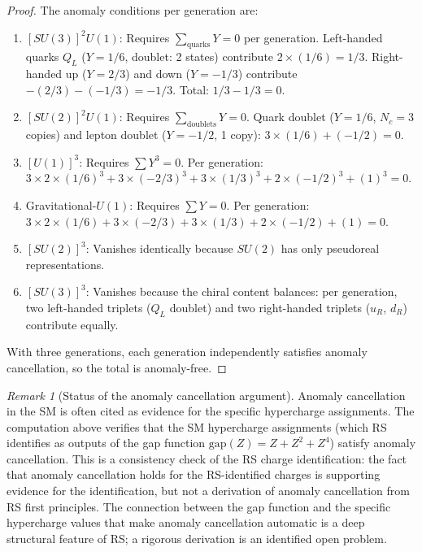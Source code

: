 \documentclass[12pt,a4paper]{article}
\theoremstyle{definition}
\theoremstyle{remark}
\newtheorem{remark}[theorem]{Remark}
\begin{document}
\begin{proof}
The anomaly conditions per generation are:
\begin{enumerate}[label=(\roman*)]
  \item $[SU(3)]^2 U(1)$: Requires
  $\sum_{\mathrm{quarks}} Y = 0$ per generation.
  Left-handed quarks $Q_L$ ($Y = 1/6$, doublet: 2 states)
  contribute $2 \times (1/6) = 1/3$.  Right-handed up
  ($Y = 2/3$) and down ($Y = -1/3$) contribute
  $-(2/3) - (-1/3) = -1/3$.  Total: $1/3 - 1/3 = 0$.

  \item $[SU(2)]^2 U(1)$: Requires $\sum_{\mathrm{doublets}} Y = 0$.
  Quark doublet ($Y = 1/6$, $N_c = 3$ copies) and lepton
  doublet ($Y = -1/2$, 1 copy): $3 \times (1/6) + (-1/2) = 0$.

  \item $[U(1)]^3$: Requires $\sum Y^3 = 0$.  Per generation:
  $3 \times 2 \times (1/6)^3 + 3 \times (-2/3)^3 +
  3 \times (1/3)^3 + 2 \times (-1/2)^3 + (1)^3 = 0$.

  \item Gravitational-$U(1)$: Requires $\sum Y = 0$.
  Per generation: $3 \times 2 \times (1/6) + 3 \times (-2/3) +
  3 \times (1/3) + 2 \times (-1/2) + (1) = 0$.

  \item $[SU(2)]^3$: Vanishes identically because $SU(2)$
  has only pseudoreal representations.

  \item $[SU(3)]^3$: Vanishes because the chiral content
  balances: per generation, two left-handed triplets ($Q_L$
  doublet) and two right-handed triplets ($u_R$, $d_R$)
  contribute equally.
\end{enumerate}
With three generations, each generation independently satisfies
anomaly cancellation, so the total is anomaly-free.
\end{proof}

\begin{remark}[Status of the anomaly cancellation argument]
Anomaly cancellation in the SM is often cited as evidence for
the specific hypercharge assignments.  The computation above verifies
that the SM hypercharge assignments (which RS identifies as outputs of the gap
function $\mathrm{gap}(Z) = Z + Z^2 + Z^4$) satisfy anomaly cancellation.
This is a consistency check of the RS charge identification: the fact that
anomaly cancellation holds for the RS-identified charges is supporting
evidence for the identification, but not a derivation of anomaly cancellation
from RS first principles.  The connection between the gap function and the
specific hypercharge values that make anomaly cancellation automatic is a deep
structural feature of RS; a rigorous derivation is an identified open problem.
\end{remark}
\end{document}
